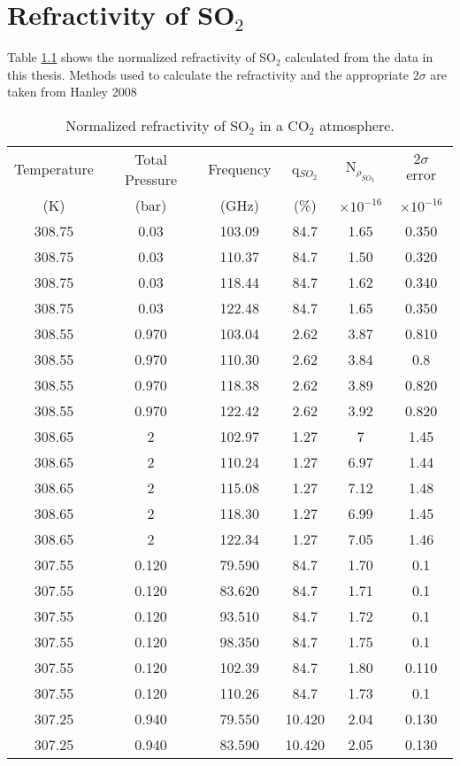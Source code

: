 \chapter{Refractivity of SO$_2$}

Table \ref{long} shows the normalized refractivity of SO$_2$ calculated from the data in this thesis. Methods used to calculate the refractivity and the appropriate $2\sigma$ are taken from Hanley 2008 \cite{Hanley-thesis}

\begin{longtable}{||c|c|c|c|c|c||}
\caption{Normalized refractivity of SO$_2$ in a CO$_2$ atmosphere. \label{long}}\\
\hline
Temperature &Total Pressure & Frequency & q$_{SO_2}$ & N$_{\rho_{SO_2}}$ & $2\sigma$ error \\
(K) &(bar) & (GHz) &(\%) & $\times 10^{-16}$&$\times 10^{-16}$\\
\hline
308.75	&0.03	&103.09	&84.7	&1.65	&0.350\\
308.75	&0.03	&110.37	&84.7	&1.50	&0.320\\
308.75	&0.03	&118.44	&84.7	&1.62	&0.340\\
308.75	&0.03	&122.48	&84.7	&1.65	&0.350\\
308.55	&0.970	&103.04	&2.62	&3.87	&0.810\\
308.55	&0.970	&110.30	&2.62	&3.84	&0.8\\
308.55	&0.970	&118.38	&2.62	&3.89	&0.820\\
308.55	&0.970	&122.42	&2.62	&3.92	&0.820\\
308.65	&2		&102.97	&1.27	&7		&1.45\\
308.65	&2		&110.24	&1.27	&6.97	&1.44\\
308.65	&2		&115.08	&1.27	&7.12	&1.48\\
308.65	&2		&118.30	&1.27	&6.99	&1.45\\
308.65	&2		&122.34	&1.27	&7.05	&1.46\\
307.55	&0.120	&79.590	&84.7	&1.70	&0.1\\
307.55	&0.120	&83.620	&84.7	&1.71	&0.1\\
307.55	&0.120	&93.510	&84.7	&1.72	&0.1\\
307.55	&0.120	&98.350	&84.7	&1.75	&0.1\\
307.55	&0.120	&102.39	&84.7	&1.80	&0.110\\
307.55	&0.120	&110.26	&84.7	&1.73	&0.1\\
307.25	&0.940	&79.550	&10.420	&2.04	&0.130\\
307.25	&0.940	&83.590	&10.420	&2.05	&0.130\\

\end{longtable}
